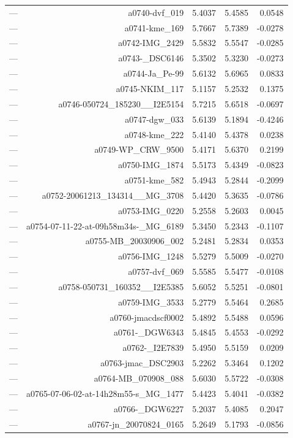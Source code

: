 \begin{table}[htbp]
\begin{tabular}{lrrrr}
— & a0740-dvf_019 & 5.4037 & 5.4585 & 0.0548 \\
— & a0741-kme_169 & 5.7667 & 5.7389 & -0.0278 \\
— & a0742-IMG_2429 & 5.5832 & 5.5547 & -0.0285 \\
— & a0743-_DSC6146 & 5.3502 & 5.3230 & -0.0273 \\
— & a0744-Ja_Pe-99 & 5.6132 & 5.6965 & 0.0833 \\
— & a0745-NKIM_117 & 5.1157 & 5.2532 & 0.1375 \\
— & a0746-050724_185230__I2E5154 & 5.7215 & 5.6518 & -0.0697 \\
— & a0747-dgw_033 & 5.6139 & 5.1894 & -0.4246 \\
— & a0748-kme_222 & 5.4140 & 5.4378 & 0.0238 \\
— & a0749-WP_CRW_9500 & 5.4171 & 5.6370 & 0.2199 \\
— & a0750-IMG_1874 & 5.5173 & 5.4349 & -0.0823 \\
— & a0751-kme_582 & 5.4943 & 5.2844 & -0.2099 \\
— & a0752-20061213_134314__MG_3708 & 5.4420 & 5.3635 & -0.0786 \\
— & a0753-IMG_0220 & 5.2558 & 5.2603 & 0.0045 \\
— & a0754-07-11-22-at-09h58m34s-_MG_6189 & 5.3450 & 5.2343 & -0.1107 \\
— & a0755-MB_20030906_002 & 5.2481 & 5.2834 & 0.0353 \\
— & a0756-IMG_1248 & 5.5279 & 5.5009 & -0.0270 \\
— & a0757-dvf_069 & 5.5585 & 5.5477 & -0.0108 \\
— & a0758-050731_160352__I2E5385 & 5.6052 & 5.5251 & -0.0801 \\
— & a0759-IMG_3533 & 5.2779 & 5.5464 & 0.2685 \\
— & a0760-jmacdscf0002 & 5.4892 & 5.5488 & 0.0596 \\
— & a0761-_DGW6343 & 5.4845 & 5.4553 & -0.0292 \\
— & a0762-_I2E7839 & 5.4950 & 5.5159 & 0.0209 \\
— & a0763-jmac_DSC2903 & 5.2262 & 5.3464 & 0.1202 \\
— & a0764-MB_070908_088 & 5.6030 & 5.5722 & -0.0308 \\
— & a0765-07-06-02-at-14h28m55-s_MG_1477 & 5.4423 & 5.4041 & -0.0382 \\
— & a0766-_DGW6227 & 5.2037 & 5.4085 & 0.2047 \\
— & a0767-jn_20070824_0165 & 5.2649 & 5.1793 & -0.0856 \\

\end{tabular}
\end{table}
